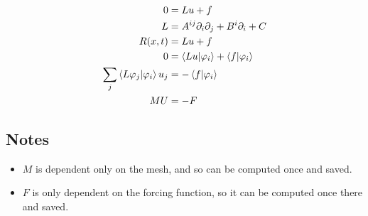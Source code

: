 \documentclass[12pt]{amsart}
\newcommand{\p}{\partial}
\newcommand{\ph}{\varphi}
\begin{document}
\begin{align*}
   0&=Lu+f\\
   L&=A^{ij}\p_i\p_j+B^i\p_i+C\\
   R(x,t)&=Lu+f\\
   0&=\ip{Lu}{\ph_i}+\ip{f}{\ph_i}\\
   \sum_j\ip{L\ph_j}{\ph_i}u_j&=-\ip{f}{\ph_i}\\
   MU&=-F\\
\end{align*}

\subsection{Notes}%
\label{sub:notes}

\begin{itemize}
  \item $M$ is dependent only on the mesh, and so can be computed once and
    saved.
  \item $F$ is only dependent on the forcing function, so it can be computed
    once there and saved.
\end{itemize}
\end{document}
